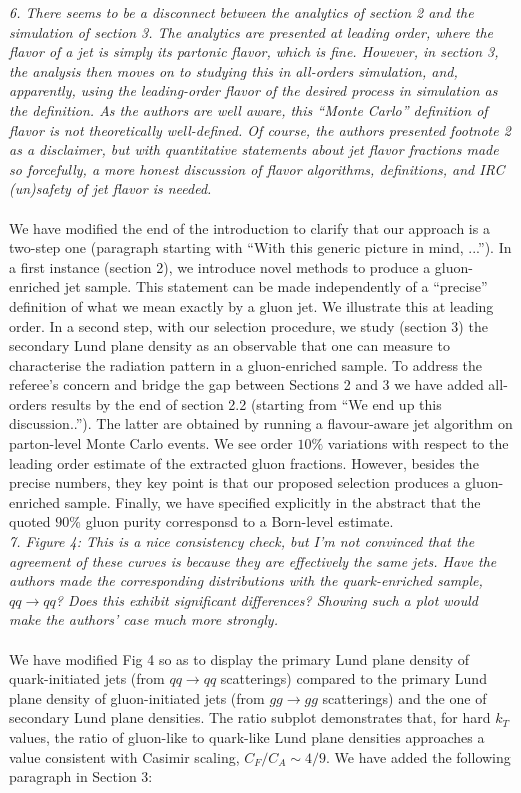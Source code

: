 \documentclass[a4paper,11pt]{article}
\begin{document}
\noindent\textit{6. There seems to be a disconnect between the analytics of section 2 and the simulation of section 3. The analytics are presented at leading order, where the flavor of a jet is simply its partonic flavor, which is fine. However, in section 3, the analysis then moves on to studying this in all-orders simulation, and, apparently, using the leading-order flavor of the desired process in simulation as the definition. As the authors are well aware, this “Monte Carlo” definition of flavor is not theoretically well-defined. Of course, the authors presented footnote 2 as a disclaimer, but with quantitative statements about jet flavor fractions made so forcefully, a more honest discussion of flavor algorithms, definitions, and IRC (un)safety of jet flavor is needed.}
\\
\\
We have modified the end of the introduction to clarify that our approach is a two-step one (paragraph starting with ``With this generic picture in mind, ...''). In a first instance (section 2), we introduce novel methods to produce a gluon-enriched jet sample. This statement can be made independently of a “precise” definition of what we mean exactly by a gluon jet. We illustrate this at leading order.  In a second step, with our selection procedure, we study (section 3) the secondary Lund plane density as an observable that one can measure to characterise the radiation pattern in a gluon-enriched sample. To address the referee’s concern and bridge the gap between Sections 2 and 3 we have added all-orders results by the end of section 2.2 (starting from ``We end up this discussion..''). The latter are obtained by running a flavour-aware jet algorithm on parton-level Monte Carlo events. We see order $10\%$ variations with respect to the leading order estimate of the extracted gluon fractions. However, besides the precise numbers, they key point is that our proposed selection produces a gluon-enriched sample.
%
Finally, we have specified explicitly in the abstract that the quoted
$90\%$ gluon purity corresponsd to a Born-level estimate.
\\

\noindent\textit{7. Figure 4: This is a nice consistency check, but I’m not convinced that the agreement of these curves is because they are effectively the same jets. Have the authors made the corresponding distributions with the quark-enriched sample, $qq\to qq$? Does this exhibit significant differences? Showing such a plot would make the authors’ case much more strongly.}
\\
\\
We have modified Fig 4 so as to display the primary Lund plane density of quark-initiated jets (from $qq\to qq$ scatterings) compared to the primary Lund plane density of gluon-initiated jets (from $gg\to gg$ scatterings) and the one of secondary Lund plane densities. The ratio subplot demonstrates that, for hard $k_T$ values, the ratio of gluon-like to quark-like Lund plane densities approaches a value consistent with Casimir scaling, $C_F/C_A \sim 4/9$. We have added the following paragraph in Section 3:
\\
\end{document}
